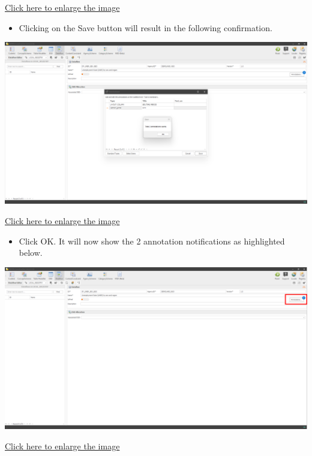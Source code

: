 \documentclass[
]{book}
\providecommand{\tightlist}{%
  \setlength{\itemsep}{0pt}\setlength{\parskip}{0pt}}
\begin{document}
\href{images/image264.png}{Click here to enlarge the image}

\begin{itemize}
\tightlist
\item
  Clicking on the Save button will result in the following confirmation.
\end{itemize}

\begin{center}\includegraphics[width=1\linewidth]{./images/image265} \end{center}

\href{images/image265.png}{Click here to enlarge the image}

\begin{itemize}
\tightlist
\item
  Click OK. It will now show the 2 annotation notifications as highlighted below.
\end{itemize}

\begin{center}\includegraphics[width=1\linewidth]{./images/image266} \end{center}

\href{images/image266.png}{Click here to enlarge the image}
\end{document}
